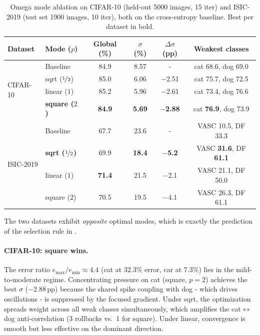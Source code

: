 \documentclass[11pt,a4paper]{article}
\begin{document}
\begin{table}[ht]
\centering
\caption{Omega mode ablation on CIFAR-10 (held-out 5000 images, 15 iter)
and ISIC-2019 (test set 1900 images, 10 iter), both on the cross-entropy
baseline. Best per dataset in bold.}
\label{tab:omega-ablation}
\begin{tabular}{llcccc}
\toprule
Dataset & Mode ($p$) & Global (\%) & $\sigma$ (\%) & $\Delta\sigma$ (pp)
  & Weakest classes \\
\midrule
\multirow{4}{*}{CIFAR-10}
  & Baseline     & 84.9 & 8.57 & -   & cat 68.6, dog 69.0 \\
  & sqrt ($\nicefrac{1}{2}$) & 85.0 & 6.06 & $-$2.51 & cat 75.7, dog 72.5 \\
  & linear ($1$) & 85.2 & 5.96 & $-$2.61 & cat 73.4, dog 76.6 \\
  & \textbf{square ($2$)} & \textbf{84.9} & \textbf{5.69} & $\bm{-}$\textbf{2.88}
    & cat \textbf{76.9}, dog 73.9 \\
\midrule
\multirow{4}{*}{ISIC-2019}
  & Baseline     & 67.7 & 23.6 & -   & VASC 10.5, DF 33.3 \\
  & \textbf{sqrt ($\nicefrac{1}{2}$)} & 69.9 & \textbf{18.4} & $\bm{-}$\textbf{5.2}
    & VASC \textbf{31.6}, DF \textbf{61.1} \\
  & linear ($1$) & \textbf{71.4} & 21.5 & $-$2.1 & VASC 21.1, DF 50.0 \\
  & square ($2$) & 70.5 & 19.5 & $-$4.1 & VASC 26.3, DF 61.1 \\
\bottomrule
\end{tabular}
\end{table}

The two datasets exhibit \emph{opposite} optimal modes, which is exactly
the prediction of the selection rule in .

\paragraph{CIFAR-10: square wins.}
The error ratio $e_{\max}/e_{\min} \approx 4.4$ (cat at $32.3\%$ error,
car at $7.3\%$) lies in the mild-to-moderate regime. Concentrating pressure on cat
(square, $p=2$) achieves the best $\sigma$ ($-$2.88\,pp) because the
shared spike coupling with dog - which drives oscillations - is suppressed
by the focused gradient. Under sqrt, the optimization spreads weight across
all weak classes simultaneously, which amplifies the cat$\leftrightarrow$dog
anti-correlation (3 rollbacks vs.\ 1 for square). Under linear,
convergence is smooth but less effective on the dominant direction.
\end{document}
